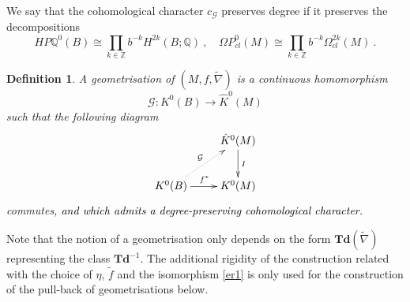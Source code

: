 \documentclass[12pt]{article}
\newtheorem{ddd}[theorem]{Definition}
\newcommand{\cG}{{\mathcal{G}}}
\newcommand{\Z}{{\mathbb{Z}}}
\newcommand{\Q}{{\mathbb{Q}}}
\newcommand{\Td}{{\mathbf{Td}}}
\begin{document}
 
 
  We say that the cohomological character $c_{\cG}$ preserves degree if it preserves the decompositions
$$HP\Q^{0}(B)\cong \prod_{k\in \Z} b^{-k} H^{2k}(B;\Q)\ ,\quad 
\Omega P^{0}_{cl}(M)\cong \prod_{k\in \Z} b^{-k}\Omega^{2k}_{cl}(M)\ .$$

\begin{ddd}\label{def903} A geometrisation of $(M,f,\tilde \nabla)$ is a continuous homomorphism 
$$\cG:K^{0}(B)\to \hat K^{0}(M)$$ such that the following diagram $$\xymatrix{ 
 &\hat K^{0}(M)\ar[d]^{I}  \\
K^{0}(B) \ar@{..>}[ur]^{\cG}\ar[r]^{f^{*}}&K^{0}(M) }$$ commutes, \textcolor{black}{and which admits a degree-preserving cohomological character.}
\end{ddd}
  
Note that the notion of a geometrisation only depends on the form $\Td(\tilde \nabla)$
representing the class $\Td^{-1}$. The additional rigidity of the construction related with the choice of $\eta$, $\tilde f$ and the isomorphism \eqref{er1}
is only used for the construction of the pull-back of geometrisations below.
  
\end{document}

